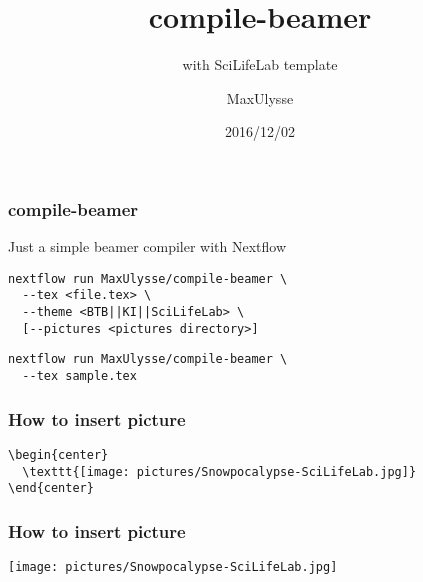 \documentclass{beamer}
\title{compile-beamer}
\subtitle{with SciLifeLab template}
\author{MaxUlysse}
\institute{Barntumörbanken / SciLifeLab}
\date{2016/12/02}
\begin{document}
\begin{frame}
	\titlepage
\end{frame}

\begin{frame}[fragile]
  \frametitle{compile-beamer}
  Just a simple beamer compiler with Nextflow
  \begin{verbatim}
nextflow run MaxUlysse/compile-beamer \
  --tex <file.tex> \
  --theme <BTB||KI||SciLifeLab> \
  [--pictures <pictures directory>]
  \end{verbatim}
  \begin{verbatim}
nextflow run MaxUlysse/compile-beamer \
  --tex sample.tex
  \end{verbatim}
\end{frame}

\begin{frame}[fragile]
  \frametitle{How to insert picture}
  \begin{verbatim}
\begin{center}
  \texttt{[image: pictures/Snowpocalypse-SciLifeLab.jpg]}
\end{center}
  \end{verbatim}
\end{frame}

\begin{frame}
  \frametitle{How to insert picture}
  \begin{center}
    \texttt{[image: pictures/Snowpocalypse-SciLifeLab.jpg]}
  \end{center}
\end{frame}
\end{document}
